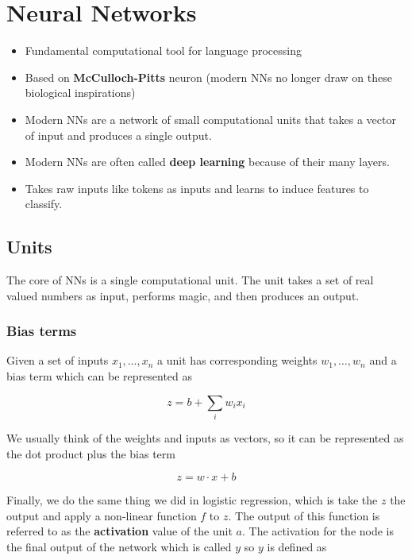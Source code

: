 \documentclass[11pt]{article}
\begin{document}
\section{Neural Networks}

\begin{itemize}
	\item Fundamental computational tool for language processing
	\item Based on \textbf{McCulloch-Pitts} neuron (modern NNs no longer draw on these biological inspirations)
	\item Modern NNs are a network of small computational units that takes a vector of input and produces a single output.
	\item Modern NNs are often called \textbf{deep learning} because of their many layers.
	\item Takes raw inputs like tokens as inputs and learns to induce features to classify.
\end{itemize}


\subsection{Units}

The core of NNs is a single computational unit. The unit takes a set of real valued numbers as input, performs magic, and then produces an output.

\subsubsection*{Bias terms}

Given a set of inputs $x_1, \dots, x_n$ a unit has corresponding weights $w_1, \dots, w_n$ and a bias term which can be represented as

\begin{equation*}
	z = b + \sum_i w_i x_i
\end{equation*}

We usually think of the weights and inputs as vectors, so it can be represented as the dot product plus the bias term

\begin{equation*}
	z = w \cdot x + b
\end{equation*}

Finally, we do the same thing we did in logistic regression, which is take the $z$ the output and apply a non-linear function $f$ to $z$. The output of this function is referred to as the \textbf{activation} value of the unit $a$. The activation for the node is the final output of the network which is called $y$ so $y$ is defined as
\end{document}

